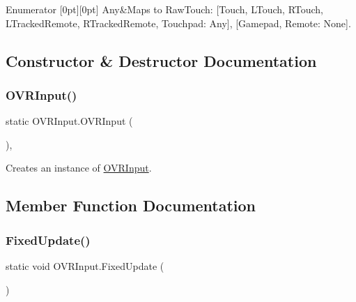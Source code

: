 \begin{DoxyEnumFields}{Enumerator}
[0pt][0pt]{}\mbox{\label{class_o_v_r_input_a4e1f1eb856223383aefc1965dd2db39aaed36a1ef76a59ee3f15180e0441188ad}} 
Any&Maps to Raw\+Touch\+: \mbox{[}Touch, L\+Touch, R\+Touch, L\+Tracked\+Remote, R\+Tracked\+Remote, Touchpad\+: Any\mbox{]}, \mbox{[}Gamepad, Remote\+: None\mbox{]}. \\
\hline

\end{DoxyEnumFields}


\subsection{Constructor \& Destructor Documentation}
\mbox{\label{class_o_v_r_input_a243b77bb05dd7621adb2fc3ae46f4283}} 
\subsubsection{\texorpdfstring{O\+V\+R\+Input()}{OVRInput()}}
{\footnotesize\ttfamily static O\+V\+R\+Input.\+O\+V\+R\+Input (\begin{DoxyParamCaption}{ }\end{DoxyParamCaption})\hspace{0.3cm}{\ttfamily [static]}, {\ttfamily [private]}}



Creates an instance of \mbox{\hyperlink{class_o_v_r_input}{O\+V\+R\+Input}}. 



\subsection{Member Function Documentation}
\mbox{\label{class_o_v_r_input_acd501ed1f3f262609c66c37d784065dc}} 
\subsubsection{\texorpdfstring{Fixed\+Update()}{FixedUpdate()}}
{\footnotesize\ttfamily static void O\+V\+R\+Input.\+Fixed\+Update (\begin{DoxyParamCaption}{ }\end{DoxyParamCaption})\hspace{0.3cm}{\ttfamily [static]}}



